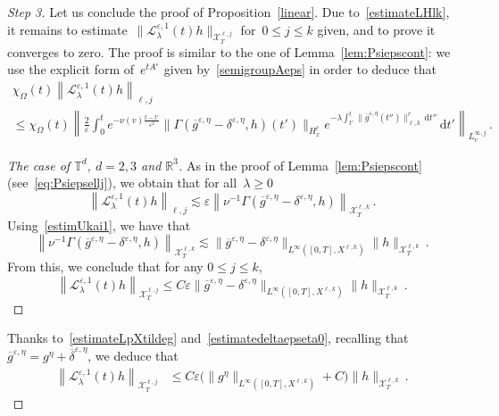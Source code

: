 \documentclass[11pt]{article}
\theoremstyle{definition}
\numberwithin{equation}{section}
\numberwithin{figure}{section}
\numberwithin{table}{section}
\newcommand*{\dd}{\mathrm{d}}
\newcommand*{\dt}{\dd t}
\newenvironment{step}[1]{\begin{proof}[#1]}{\let\qed\relax\end{proof}}
\newcommand*\R {\mathbb{R}}
\newcommand*\T {\mathbb{T}}
\newcommand*\eps{{\varepsilon}}
\newcommand*\e{{\varepsilon}}
\begin{document}
\begin{step}{Step 3}
Let us conclude the proof of Proposition~\ref{linear}. Due to~\eqref{estimateLHlk}, it remains to estimate~$\|\mathcal{L}_\lambda^{\e,1}(t)h\|_{\mathcal{X}_T^{\ell,j} }$ for~$0 \le j \le k$ given, and to prove it converges to zero. The proof is similar to the one of Lemma~\ref{lem:Psiepscont}: we use the explicit form of~$e^{tA^\e}$ given by~\eqref{semigroupAeps} in order to deduce that
\begin{multline*}
\chi_\Omega(t)\left\| \mathcal{L}_\lambda^{\e,1}(t)h \right\|_{{\ell,j}} \\
\le \chi_\Omega(t)\left\| \frac{2}{\e} \int_0^t e^{-\nu(v)\frac{t-t'}{\e^2}} \big\|\Gamma(\overline g^{\eps,\eta}-\delta^{\eps,\eta},h)(t')\big\|_{H^\ell_x} e^{-\lambda \int_{t'}^t \|\overline g^{\eps,\eta}(t'')\|^r_{\ell,k} \, \dt''} \, \dt' \right\|_{L^{\infty,j}_v}\,.
\end{multline*}

\begin{step}{The case of $\T^d$, $d = 2,3$ and $\R^3$}
As in the proof of Lemma~\ref{lem:Psiepscont} (see~\eqref{eq:Psiepsellj}), we obtain that for all~$\lambda \geq 0$
\[
\left\|\mathcal{L}_\lambda^{\e,1}(t)h\right\|_{{\ell,j}}
\lesssim \e \left\| \nu^{-1} \Gamma (\overline g^{\eps,\eta}-\delta^{\eps,\eta},h) \right\|_{\mathcal{X}_T^{\ell,k} }\,.
\]
Using~\eqref{estimUkai1}, we have that
\begin{equation}\label{eq:Lambda-1Gamma}
\left\| \nu^{-1} \Gamma (\overline g^{\eps,\eta}-\delta^{\eps,\eta},h) \right\|_{\mathcal{X}^{\ell,k}_T} \lesssim \big\|\overline g^{\eps,\eta}-\delta^{\eps,\eta}\big\|_{L^\infty([0,T], X^{\ell,k})} \|h\|_{\mathcal{X}^{\ell,k}_T}\,.
\end{equation}
From this, we conclude that for any $0 \le j \le k$,
\[
\left\|\mathcal{L}_\lambda^{\e,1}(t)h\right\|_{\mathcal{X}_T^{\ell,j} } \le C\e \big\|\overline g^{\eps,\eta}-\delta^{\eps,\eta}\big\|_{L^\infty([0,T], X^{\ell,k})} \|h\|_{\mathcal{X}_T^{\ell,k} }\,.
\]
\end{step}

Thanks to~\eqref{estimateLpXtildeg} and~\eqref{estimatedeltaepseta0}, recalling that~$\overline g^{\eps,\eta} = g^{\eta}+\overline \delta^{\eps,\eta}$, we deduce that
\begin{align*}
\left\|\mathcal{L}_\lambda^{\e,1}(t)h\right\|_{\mathcal{X}_T^{\ell,j} } &\le C\e \big(\|{g^\eta } \|_{L^\infty([0,T], X^{\ell,k})} +C\big) \|h\|_{\mathcal{X}_T^{\ell,k} }\,.
\end{align*}


\end{step}
\end{document}
